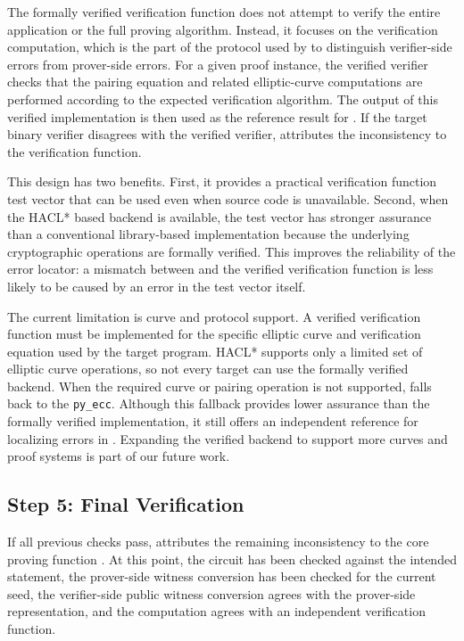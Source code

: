 The formally verified verification function does not attempt to verify the entire \zksnark application or the full proving algorithm. Instead, it focuses on the verification computation, which is the part of the protocol used by \greyboxfuzz to distinguish verifier-side errors from prover-side errors. For a given proof instance, the verified verifier checks that the pairing equation and related elliptic-curve computations are performed according to the expected verification algorithm. The output of this verified implementation is then used as the reference result for \vfunc. If the target binary verifier disagrees with the verified verifier, \greyboxfuzz attributes the inconsistency to the verification function.

This design has two benefits. First, it provides a practical verification function test vector that can be used even when source code is unavailable. Second, when the HACL* based backend is available, the test vector has stronger assurance than a conventional library-based implementation because the underlying cryptographic operations are formally verified. This improves the reliability of the error locator: a mismatch between \vfunc and the verified verification function is less likely to be caused by an error in the test vector itself.

The current limitation is curve and protocol support. A verified verification function must be implemented for the specific elliptic curve and verification equation used by the target \zksnark program. HACL* supports only a limited set of elliptic curve operations, so not every target can use the formally verified backend. When the required curve or pairing operation is not supported, \greyboxfuzz falls back to the \texttt{py\_ecc}. Although this fallback provides lower assurance than the formally verified implementation, it still offers an independent reference for localizing errors in \vfunc. Expanding the verified backend to support more curves and proof systems is part of our future work.

\subsection{Step 5: Final Verification}

If all previous checks pass, \greyboxfuzz attributes the remaining inconsistency to the core proving function \pfunc. At this point, the circuit has been checked against the intended statement, the prover-side witness conversion has been checked for the current seed, the verifier-side public witness conversion agrees with the prover-side representation, and the \vfunc computation agrees with an independent verification function.

